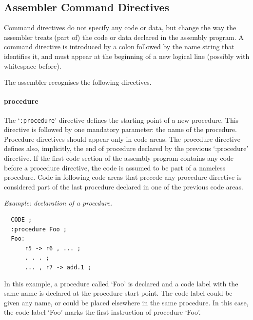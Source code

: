 \documentclass[a4paper,twoside]{tceusermanual}
\begin{document}

\subsection{Assembler Command Directives}
\label{ssec:directives}

Command directives do not specify any code or data, but change the way the
assembler treats (part of) the code or data declared in the assembly
program.
%
A command directive is introduced by a colon followed by the name string
that identifies it, and must appear at the beginning of a new logical line
(possibly with whitespace before).

The assembler recognises the following directives.

\paragraph{procedure}
The `\verb|:procedure|' directive defines the starting point of a new
procedure. This directive is followed by one mandatory parameter: the name
of the procedure. Procedure directives should appear only in code areas. The
procedure directive defines also, implicitly, the end of procedure declared
by the previous `:procedure' directive. If the first code section of the
assembly program contains any code before a procedure directive, the code
is assumed to be part of a nameless procedure. Code in following code areas
that precede any procedure directive is considered part of the last
procedure declared in one of the previous code areas.

\emph{Example: declaration of a procedure.}
\begin{verbatim}
  CODE ;
  :procedure Foo ;
  Foo:
      r5 -> r6 , ... ;
      . . . ;
      ... , r7 -> add.1 ;
\end{verbatim}
%
In this example, a procedure called `Foo' is declared and a code label with
the same name is declared at the procedure start point. The code label could
be given any name, or could be placed elsewhere in the same procedure. In
this case, the code label `Foo' marks the first instruction of procedure
`Foo'.
\end{document}
